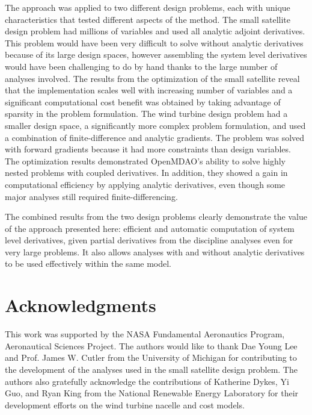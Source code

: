 \documentclass[]{aiaa-tc} %
\begin{document}
      The approach was applied to two different design problems, each with unique characteristics that 
      tested different aspects of the method. The small satellite design problem had millions of variables and used all analytic adjoint derivatives.
      This problem would have been very difficult to solve without analytic derivatives because of its large design spaces, however assembling the 
      system level derivatives would have been challenging to do by hand thanks to the large number of analyses involved. 
      The results from the optimization of the small satellite reveal that the implementation scales well with increasing 
      number of variables and a significant computational cost benefit was obtained by taking advantage of 
      sparsity in the problem formulation. The wind turbine design problem had a smaller design space, a 
      significantly more complex problem formulation, and used a combination of finite-difference and analytic 
      gradients. The problem was solved with forward gradients because it had more constraints than design variables. 
      The optimization results demonstrated OpenMDAO's ability to solve highly nested problems with coupled derivatives.
      In addition, they showed a gain in computational efficiency by applying analytic derivatives, even though some major 
      analyses still required finite-differencing. 

      The combined results from the two design problems clearly demonstrate the value of the approach presented here: efficient and 
      automatic computation of system level derivatives, given partial derivatives from the discipline analyses 
      even for very large problems. It also allows analyses with and without analytic derivatives to be used effectively 
      within the same model. 


  \section{Acknowledgments}

      This work was supported by the NASA Fundamental Aeronautics Program, Aeronautical Sciences Project. 
      The authors would like to thank Dae Young Lee and Prof. James W. Cutler from the University of Michigan 
      for contributing to the development of the analyses used in the small satellite design problem.  The authors also gratefully acknowledge the contributions of Katherine Dykes, Yi Guo, and Ryan King from the National Renewable Energy Laboratory for their development efforts on the wind turbine nacelle and cost models.

  
\end{document}
